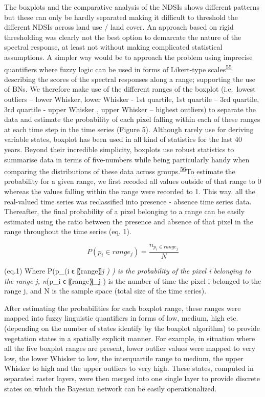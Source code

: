 \documentclass[12pt,oneside]{article}
\begin{document}
The boxplots and the comparative analysis of the NDSIs shows different
patterns but these can only be hardly separated making it difficult to
threshold the different NDSIs across land use / land cover. An approach
based on rigid thresholding was clearly not the best option to demarcate
the nature of the spectral response, at least not without making
complicated statistical assumptions. A simpler way would be to approach
the problem using imprecise quantifiers where fuzzy logic can be used in
forms of Likert-type
scales\textsuperscript{\protect\hyperlink{ref-Likert_1932}{55}}
describing the scores of the spectral responses along a range;
supporting the use of BNs. We therefore make use of the different ranges
of the boxplot (i.e.~lowest outliers -- lower Whisker, lower Whisker -
1st quartile, 1st quartile -- 3rd quartile, 3rd quartile - upper Whisker
, upper Whisker -- highest outliers) to separate the data and estimate
the probability of each pixel falling within each of these ranges at
each time step in the time series (Figure 5). Although rarely use for
deriving variable states, boxplot has been used in all kind of
statistics for the last 40 years. Beyond their incredible simplicity,
boxplots use robust statistics to summarise data in terms of
five-numbers while being particularly handy when comparing the
distributions of these data across
groups.\textsuperscript{\protect\hyperlink{ref-Wickham_and_Stryjewski_2012}{56}}To
estimate the probability for a given range, we first recoded all values
outside of that range to 0 whereas the values falling within the range
were recorded to 1. This way, all the real-valued time series was
reclassified into presence - absence time series data. Thereafter, the
final probability of a pixel belonging to a range can be easily
estimated using the ratio between the presence and absence of that pixel
in the range throughout the time series (eq. 1).

\[P(p_i \in range_j) = \frac{n_{p_i \in range_j}}{N}\]

(eq.1) Where P(p\_(i ϵ 〖range〗\emph{j ) ) is the probability of the
pixel i belonging to the range j, n}(p\_i ϵ 〖range〗\_j ) is the number
of time the pixel i belonged to the range j, and N is the sample space
(total size of the time series).

After estimating the probabilities for each boxplot range, these ranges
were mapped into fuzzy linguistic quantifiers in forms of low, medium,
high etc. (depending on the number of states identify by the boxplot
algorithm) to provide vegetation states in a spatially explicit manner.
For example, in situation where all the five boxplot ranges are present,
lower outlier values were mapped to very low, the lower Whisker to low,
the interquartile range to medium, the upper Whisker to high and the
upper outliers to very high. These states, computed in separated raster
layers, were then merged into one single layer to provide discrete
states on which the Bayesian network can be easily operationalized.
\end{document}

